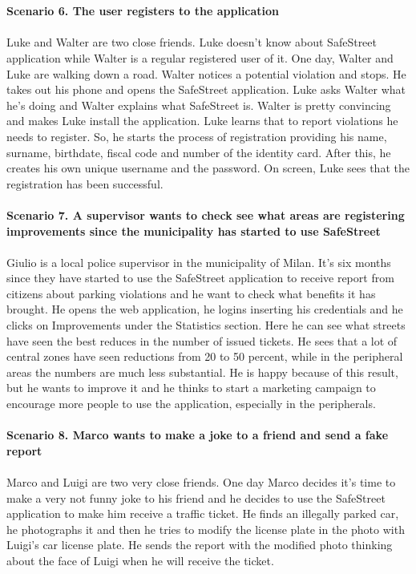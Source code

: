 \documentclass[a4paper]{report}
\begin{document}
\\
\\
\textbf{Scenario 6. The user registers to the application}\\
\\
Luke and Walter are two close friends. Luke doesn’t know about SafeStreet application while Walter is a regular registered user of it. One day, Walter and Luke are walking down a road. Walter notices a potential violation and stops. He takes out his phone and opens the SafeStreet application. Luke asks Walter what he’s doing and Walter explains what SafeStreet is. Walter is pretty convincing and makes Luke install the application. Luke learns that to report violations he needs to register. So, he starts the process of registration providing his name, surname, birthdate, fiscal code and number of the identity card. After this, he creates his own unique username and the password. On screen, Luke sees that the registration has been successful. 
\\
\\
\textbf{Scenario 7. A supervisor wants to check see what areas are registering improvements since the municipality has started to use SafeStreet}\\
\\
Giulio is a local police supervisor in the municipality of Milan. It’s six months since they have started to use the SafeStreet application to receive report from citizens about parking violations and he want to check what benefits it has brought. He opens the web application, he logins inserting his credentials and he clicks on Improvements under the Statistics section. Here he can see what streets have seen the best reduces in the number of issued tickets. He sees that a lot of central zones have seen reductions from 20 to 50 percent, while in the peripheral areas the numbers are much less substantial. He is happy because of this result, but he wants to improve it and he thinks to start a marketing campaign to encourage more people to use the application, especially in the peripherals. 
\\ 
\\
\textbf{Scenario 8. Marco wants to make a joke to a friend and send a fake report}\\
\\
Marco and Luigi are two very close friends. One day Marco decides it’s time to make a very not funny joke to his friend and he decides to use the SafeStreet application to make him receive a traffic ticket. He finds an illegally parked car, he photographs it and then he tries to modify the license plate in the photo with Luigi’s car license plate. He sends the report with the modified photo thinking about the face of Luigi when he will receive the ticket. 
\end{document}
